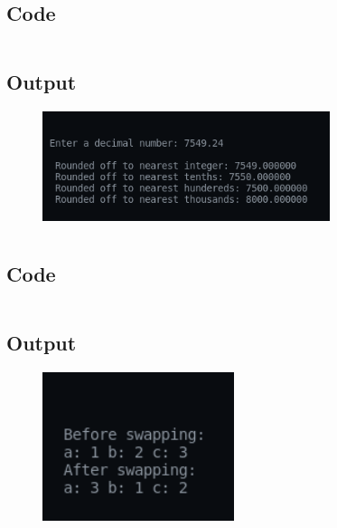 \documentclass[12pt]{article}
\begin{document}
\newpage
\section{}
\subsection{Code}
\inputminted{c}{q7.c}
\subsection{Output}
\begin{figure}[h]
    \centering
    \includegraphics[width=0.75\textwidth]{7.png}
\end{figure}

\newpage
\section{}
\subsection{Code}
\inputminted{c}{q8.c}
\newpage
\subsection{Output}
\begin{figure}[h]
    \centering
    \includegraphics[width=0.5\textwidth]{8.png}
\end{figure}
\newpage
\section{}
\end{document}
